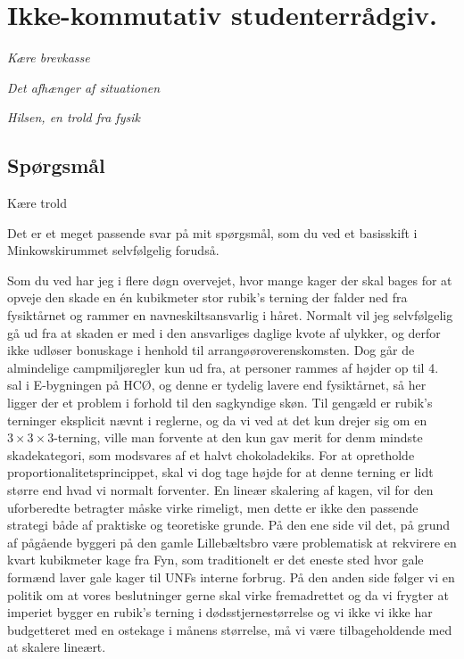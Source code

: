 

\begin{minipage}[b]{0.95\linewidth}
\begin{minipage}[t]{0.47\textwidth}
\vspace{1mm}
\section*{Ikke-kommutativ studenterrådgiv.}
\emph{Kære brevkasse}

\emph{Det afhænger af situationen}

\emph{Hilsen, en trold fra fysik}

\subsection*{Spørgsmål}

Kære trold

Det er et meget passende svar på mit spørgsmål, som du ved et basisskift i Minkowskirummet selvfølgelig forudså.

Som du ved har jeg i flere døgn overvejet, hvor mange kager der skal bages for at opveje den skade en én kubikmeter stor rubik's terning der falder ned fra fysiktårnet og rammer en navneskiltsansvarlig i håret. Normalt vil jeg selvfølgelig gå ud fra at skaden er med i den ansvarliges daglige kvote af ulykker, og derfor ikke udløser bonuskage i henhold til arrangøøroverenskomsten. Dog går de almindelige campmiljøregler kun ud fra, at personer rammes af højder op til 4. sal i E-bygningen på HCØ, og denne er tydelig lavere end fysiktårnet, så her ligger der et problem i forhold til den sagkyndige skøn. Til gengæld er rubik's terninger eksplicit nævnt i reglerne, og da vi ved at det kun drejer sig om en $3 \times 3 \times 3$-terning, ville man forvente at den kun gav merit for denm mindste skadekategori, som modsvares af et halvt chokoladekiks. For at opretholde proportionalitetsprincippet, skal vi dog tage højde for at denne terning er lidt større end hvad vi normalt forventer. En lineær skalering af kagen, vil for den uforberedte betragter måske virke rimeligt, men dette er ikke den passende strategi både af praktiske og teoretiske grunde. På den ene side vil det, på grund af pågående byggeri på den gamle Lillebæltsbro være problematisk at rekvirere en kvart kubikmeter kage fra Fyn, som traditionelt er det eneste sted hvor gale formænd laver gale kager til UNFs interne forbrug. På den anden side følger vi en politik om at vores beslutninger gerne skal virke fremadrettet og da vi frygter at imperiet bygger en rubik's terning i dødsstjernestørrelse og vi ikke vi ikke har budgetteret med en ostekage i månens størrelse, må vi være tilbageholdende med at skalere lineært.


\end{minipage}
\end{minipage}
